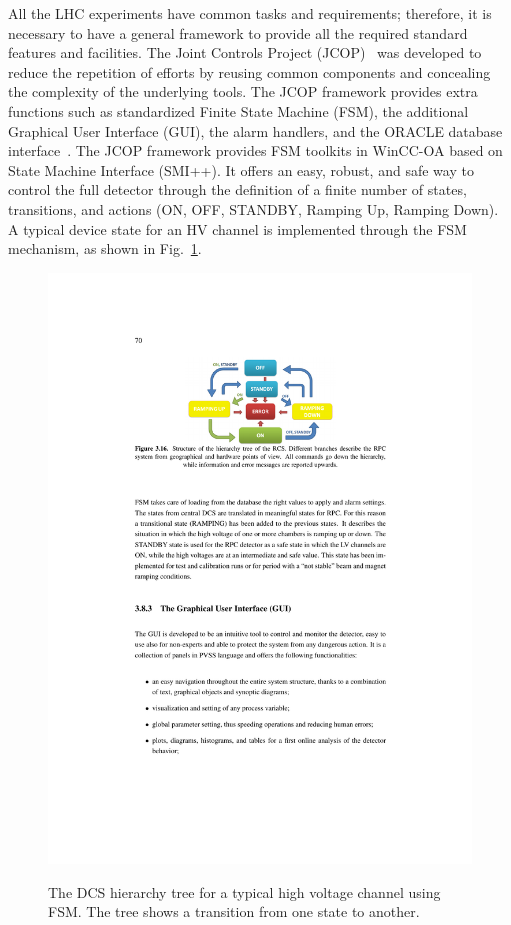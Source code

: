 All the LHC experiments have common tasks and requirements; therefore, it is necessary to have a general framework to provide all the required standard features and facilities. The Joint Controls Project (JCOP)~\cite{jcop} was developed to reduce the repetition of efforts by reusing common components and concealing the complexity of the underlying tools. The JCOP framework provides extra functions such as standardized Finite State Machine (FSM), the additional Graphical User Interface (GUI), the alarm handlers, and the ORACLE database interface~\cite{g-polese}.
The JCOP framework provides FSM toolkits in WinCC-OA based on State Machine Interface (SMI++). It offers an easy, robust, and safe way to control the full detector through the definition of a finite number of states, transitions, and actions (ON, OFF, STANDBY, Ramping Up, Ramping Down). A typical device state for an HV channel is implemented through the FSM mechanism, as shown in Fig.~\ref{fig:hierarchy}.
\begin{figure}[H]
\centering
\hspace{-0.5cm}
\includegraphics[scale=1.5,trim=160 600 160 120,clip]{fig/wincc/hierarchy.pdf}\\
 \caption{The DCS hierarchy tree for a typical high voltage channel using FSM. The tree shows a transition from one state to another.}
\label{fig:hierarchy}
\end{figure}
